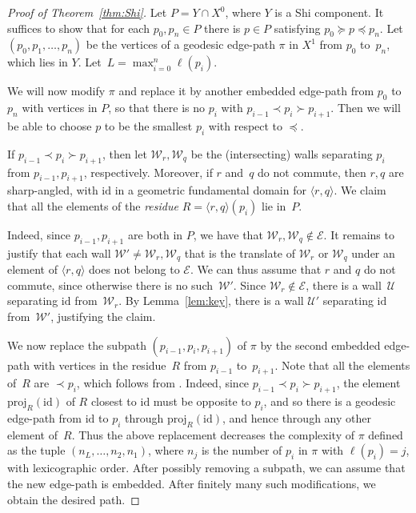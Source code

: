 \documentclass[Unicode,ALCO]{cedram}
\newcommand{\id}{\mathrm{id}}
\newcommand{\W}{\mathcal{W}}
\newcommand{\U}{\mathcal{U}}
\begin{document}
\begin{proof}[Proof of Theorem~\ref{thm:Shi}] Let $P=Y\cap X^0$, where $Y$ is a Shi component.
	It suffices to show that for each $p_0,p_n\in P$ there is $p\in P$ satisfying $p_0\succeq p\preceq p_n$. Let $(p_0,p_1,\ldots,p_n)$ be the
	vertices of a geodesic edge-path $\pi$ in $X^1$ from $p_0$ to~$p_n$, which lies in $Y$. Let~$L=\max_{i=0}^n\ell(p_i)$.
	
	We will now modify $\pi$ and replace it by another embedded edge-path from $p_0$ to~$p_n$ with vertices in $P$, so that there is no
	$p_i$ with $p_{i-1}\prec p_i\succ p_{i+1}$. Then we will be able to choose $p$ to be the smallest $p_i$ with respect to $\preceq$.
	
	If $p_{i-1}\prec p_i\succ p_{i+1}$, then let $\W_r,\W_q$ be the (intersecting) walls separating $p_i$ from $p_{i-1},p_{i+1}$, respectively. Moreover, if $r$ and~$q$ do not commute, then $r,q$ are sharp-angled, with $\id$
	in a geometric fundamental domain for $\langle r,q\rangle$. We claim that all the elements of the \emph{residue} $R=\langle r,q\rangle (p_i)$ lie in~$P$.
	
	Indeed, since $p_{i-1},p_{i+1}$ are both in $P$, we have that $\W_r,\W_q\notin \mathcal E$. 
	It remains to justify that each wall $\W'\neq \W_r,\W_q$ that is the translate
	of $\W_r$ or $\W_q$ under an element of $\langle r,q\rangle$ does not belong to $\mathcal E$. We can thus assume that $r$ and $q$ do not commute, since otherwise there is no
	such~$\W'$. Since $\W_r\notin \mathcal E$, there is a wall~$\U$ separating $\id$ from~$\W_r$. By Lemma~\ref{lem:key}, there is a wall $\U'$ separating $\id$
	from~$\W'$, justifying the claim.
	
	We now replace the subpath $(p_{i-1},p_i,p_{i+1})$ of $\pi$ by the second embedded edge-path with vertices in the residue~$R$ from $p_{i-1}$ to~$p_{i+1}$. Note that all the elements of~$R$ are $\prec p_i$, which follows from \cite[Thm.~2.9]{Ronan_2009}. Indeed, since $p_{i-1}\prec p_i\succ p_{i+1}$, the element $\mathrm{proj}_R(\id)$ of $R$ closest to $\id$ must be opposite to $p_i$, and so there is a geodesic edge-path from $\id$ to $p_i$ through $\mathrm{proj}_R(\id)$, and hence through any other element of~$R$. Thus the above replacement decreases the complexity
	of $\pi$ defined as the tuple $(n_L,\ldots,n_2,n_1)$, where $n_j$ is the number of $p_i$ in $\pi$ with $\ell(p_i)=j$, with lexicographic
	order. After possibly removing a subpath, we can assume that the new edge-path is embedded. After finitely many such modifications, we obtain the desired path.
\end{proof}
\end{document}
